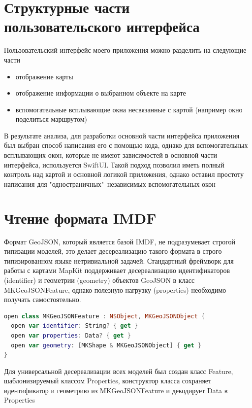   \section{Структурные части пользовательского интерфейса}
    Пользовательский интерфейс моего приложения можно разделить на следующие части
    \begin{itemize}
      \item отображение карты
      \item отображение информации о выбранном объекте на карте
      \item вспомогательные всплывающие окна несвязанные с картой (например окно поделиться маршрутом)
    \end{itemize}

    В результате анализа, для разработки основной части интерфейса приложения был выбран способ написания его с помощью кода, однако для вспомогательных всплывающих окон, которые не имеют зависимостей в основной части интерфейса, используется SwiftUI. Такой подход позволил иметь полный контроль над картой и основной логикой приложения, однако оставил простоту написания для "одностраничных"\ независимых вспомогательных окон


  \section{Чтение формата IMDF}
    Формат GeoJSON, который является базой IMDF, не подразумевает строгой типизации моделей, это делает десереализацию такого формата в строго типизированном языке нетривиальной задачей. Стандартный фреймворк для работы с картами MapKit поддерживает десереализацию идентификаторов (identifier) и геометрии (geometry) объектов GeoJSON в класс MKGeoJSONFeature, однако полезную нагрузку (properties) необходимо получать самостоятельно.

    \begin{lstlisting}[language=swift,caption={Интерфейс объекта MKGeoJSONFeature}]
open class MKGeoJSONFeature : NSObject, MKGeoJSONObject {
  open var identifier: String? { get }
  open var properties: Data? { get }
  open var geometry: [MKShape & MKGeoJSONObject] { get }
}
  \end{lstlisting}

    Для универсальной десереализации всех моделей был создан класс Feature, шаблонизируемый классом Properties, конструктор класса сохраняет идентификатор и геометрию из MKGeoJSONFeature и декодирует Data в Properties

